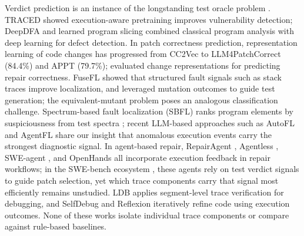 Verdict prediction is an instance of the longstanding test oracle problem \citep{barr2015oracle}.
TRACED \citep{ding2024traced} showed execution-aware pretraining improves vulnerability detection; DeepDFA \citep{steenhoek2024deepdfa} and learned program slicing \citep{yadavally2024slicing} combined classical program analysis with deep learning for defect detection.
In patch correctness prediction, representation learning of code changes has progressed from CC2Vec \citep{hoang2020cc2vec} to LLM4PatchCorrect \citep{zhou2024llm4patch} (84.4\%) and APPT \citep{appt2024} (79.7\%); \citet{tian2020patchcorrectness} evaluated change representations for predicting repair correctness.
FuseFL \citep{widyasari2024fusefl} showed that structured fault signals such as stack traces improve localization, and \citet{foster2025mutation} leveraged mutation outcomes to guide test generation; the equivalent-mutant problem \citep{papadakis2019mutation} poses an analogous classification challenge.
Spectrum-based fault localization (SBFL) ranks program elements by suspiciousness from test spectra \citep{abreu2007accuracy,jones2002visualization,wong2014dstar}; recent LLM-based approaches such as AutoFL \citep{kang2024autofl} and AgentFL \citep{qin2024agentfl} share our insight that anomalous execution events carry the strongest diagnostic signal.
In agent-based repair, RepairAgent \citep{bouzenia2025repairagent}, Agentless \citep{xia2024agentless}, SWE-agent \citep{yang2024sweagent}, and OpenHands \citep{wang2025openhands} all incorporate execution feedback in repair workflows; in the SWE-bench ecosystem \citep{jimenez2024swebench}, these agents rely on test verdict signals to guide patch selection, yet which trace components carry that signal most efficiently remains unstudied.
LDB \citep{zhong2024ldb} applies segment-level trace verification for debugging, and SelfDebug \citep{chen2024selfdebug} and Reflexion \citep{shinn2023reflexion} iteratively refine code using execution outcomes.
None of these works isolate individual trace components or compare against rule-based baselines.

